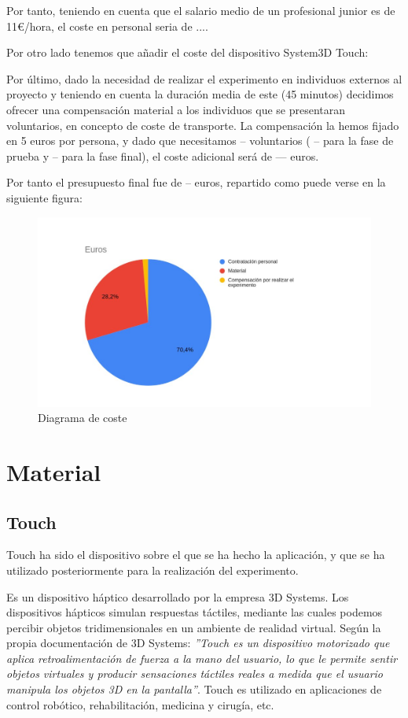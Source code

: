 \documentclass[a4paper,11pt, oneside]{book}
\begin{document}
Por tanto, teniendo en cuenta que el salario medio de un profesional junior es de 11\euro /hora, el coste en personal seria de ....

Por otro lado tenemos que añadir el coste del dispositivo System3D Touch: 

Por último, dado la necesidad de realizar el experimento en individuos externos al proyecto y teniendo en cuenta la duración media de este (45 minutos) decidimos ofrecer una compensación material a los individuos que se presentaran voluntarios, en concepto de coste de transporte. La compensación la hemos fijado en 5 euros por persona, y dado que necesitamos -- voluntarios ( -- para la fase de prueba y -- para la fase final), el coste adicional será de --- euros.

Por tanto el presupuesto final fue de -- euros, repartido como puede verse en la siguiente figura:

\begin{figure}[H]
	
	\centering
	\includegraphics[width=0.8\linewidth]{coste}
	\caption{Diagrama de coste}
	\label{fig:figura1}
	
\end{figure}

\section{Material}

\subsection{Touch}

Touch ha sido el dispositivo sobre el que se ha hecho la aplicación, y que se ha utilizado posteriormente para la realización del experimento.

Es un dispositivo háptico desarrollado por la empresa 3D Systems. Los dispositivos hápticos simulan respuestas táctiles, mediante las cuales podemos percibir objetos tridimensionales en un ambiente de realidad virtual.
Según la propia documentación de 3D Systems: \textit{''Touch es un dispositivo motorizado que aplica retroalimentación de fuerza a la mano del usuario, lo que le permite sentir objetos virtuales y producir sensaciones táctiles reales a medida que el usuario manipula los objetos 3D en la pantalla''}. Touch es utilizado en aplicaciones de control robótico, rehabilitación, medicina y cirugía, etc.
\end{document}

